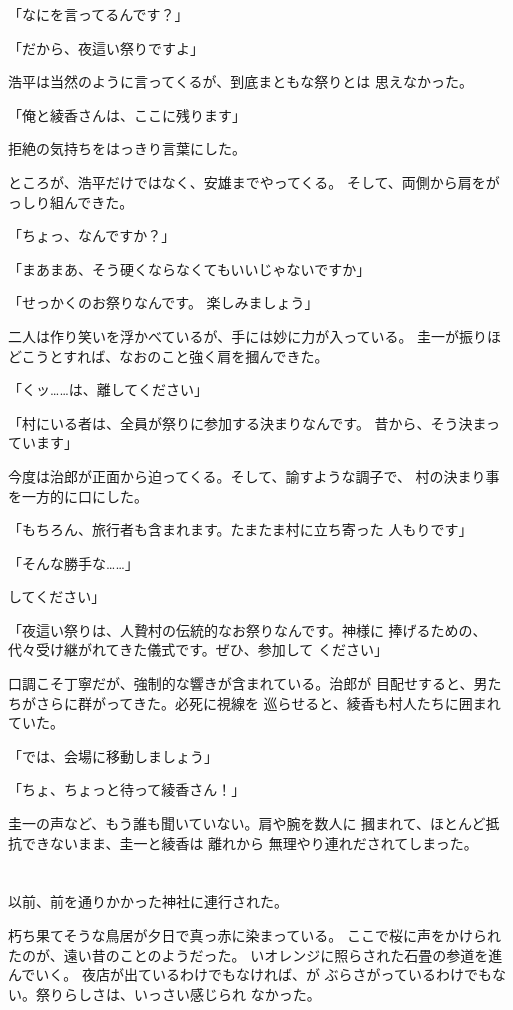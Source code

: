 ﻿\documentclass[
    book,tate,
    line_length=30zw,
    jafontsize=12pt,
    paper=b5j,
    landscape,
    ]{jlreq}
\begin{document}
「なにを言ってるんです？」

「だから、夜這い祭りですよ」

浩平は当然のように言ってくるが、到底まともな祭りとは
思えなかった。

「俺と綾香さんは、ここに残ります」

拒絶の気持ちをはっきり言葉にした。

ところが、浩平だけではなく、安雄までやってくる。
そして、両側から肩をがっしり組んできた。

「ちょっ、なんですか？」

「まあまあ、そう硬くならなくてもいいじゃないですか」

「せっかくのお祭りなんです。 楽しみましょう」

二人は作り笑いを浮かべているが、手には妙に力が入っている。
圭一が振りほどこうとすれば、なおのこと強く肩を摑んできた。

「くッ……は、離してください」

「村にいる者は、全員が祭りに参加する決まりなんです。
昔から、そう決まっています」

今度は治郎が正面から迫ってくる。そして、諭すような調子で、
村の決まり事を一方的に口にした。

「もちろん、旅行者も含まれます。たまたま村に立ち寄った
人もりです」

「そんな勝手な……」

してください」

「夜這い祭りは、人贄村の伝統的なお祭りなんです。神様に
捧げるための、代々受け継がれてきた儀式です。ぜひ、参加して
ください」

口調こそ丁寧だが、強制的な響きが含まれている。治郎が
目配せすると、男たちがさらに群がってきた。必死に視線を
巡らせると、綾香も村人たちに囲まれていた。

「では、会場に移動しましょう」

「ちょ、ちょっと待って綾香さん！」

圭一の声など、もう誰も聞いていない。肩や腕を数人に
摑まれて、ほとんど抵抗できないまま、圭一と綾香は
離れから 無理やり連れだされてしまった。

\section*{}

以前、前を通りかかった神社に連行された。

朽ち果てそうな鳥居が夕日で真っ赤に染まっている。
ここで桜に声をかけられたのが、遠い昔のことのようだった。 
いオレンジに照らされた石畳の参道を進んでいく。
夜店が出ているわけでもなければ、が
ぶらさがっているわけでもない。祭りらしさは、いっさい感じられ
なかった。
\end{document}
